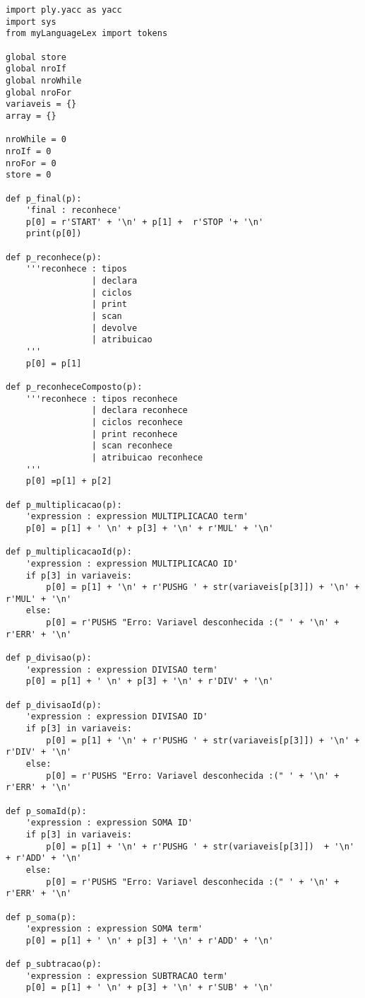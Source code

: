 \documentclass[11pt,a4paper]{report}%
\begin{document}
\begin{lstlisting}
import ply.yacc as yacc
import sys
from myLanguageLex import tokens 
 
global store 
global nroIf
global nroWhile
global nroFor
variaveis = {}
array = {}

nroWhile = 0
nroIf = 0
nroFor = 0 
store = 0

def p_final(p): 
    'final : reconhece'
    p[0] = r'START' + '\n' + p[1] +  r'STOP '+ '\n'
    print(p[0])

def p_reconhece(p): 
    '''reconhece : tipos
                 | declara
                 | ciclos
                 | print
                 | scan
                 | devolve
                 | atribuicao
    '''
    p[0] = p[1] 

def p_reconheceComposto(p): 
    '''reconhece : tipos reconhece
                 | declara reconhece
                 | ciclos reconhece 
                 | print reconhece
                 | scan reconhece
                 | atribuicao reconhece
    '''
    p[0] =p[1] + p[2] 

def p_multiplicacao(p):
    'expression : expression MULTIPLICACAO term'
    p[0] = p[1] + ' \n' + p[3] + '\n' + r'MUL' + '\n'

def p_multiplicacaoId(p): 
    'expression : expression MULTIPLICACAO ID'
    if p[3] in variaveis: 
        p[0] = p[1] + '\n' + r'PUSHG ' + str(variaveis[p[3]]) + '\n' +  r'MUL' + '\n'
    else: 
        p[0] = r'PUSHS "Erro: Variavel desconhecida :(" ' + '\n' + r'ERR' + '\n'

def p_divisao(p):
    'expression : expression DIVISAO term'
    p[0] = p[1] + ' \n' + p[3] + '\n' + r'DIV' + '\n'

def p_divisaoId(p): 
    'expression : expression DIVISAO ID'
    if p[3] in variaveis: 
        p[0] = p[1] + '\n' + r'PUSHG ' + str(variaveis[p[3]]) + '\n' + r'DIV' + '\n'
    else: 
        p[0] = r'PUSHS "Erro: Variavel desconhecida :(" ' + '\n' + r'ERR' + '\n'

def p_somaId(p): 
    'expression : expression SOMA ID'
    if p[3] in variaveis: 
        p[0] = p[1] + '\n' + r'PUSHG ' + str(variaveis[p[3]])  + '\n' + r'ADD' + '\n'
    else: 
        p[0] = r'PUSHS "Erro: Variavel desconhecida :(" ' + '\n' + r'ERR' + '\n'
 
def p_soma(p):
    'expression : expression SOMA term'
    p[0] = p[1] + ' \n' + p[3] + '\n' + r'ADD' + '\n'

def p_subtracao(p):
    'expression : expression SUBTRACAO term'
    p[0] = p[1] + ' \n' + p[3] + '\n' + r'SUB' + '\n'


\end{lstlisting}
\end{document}
